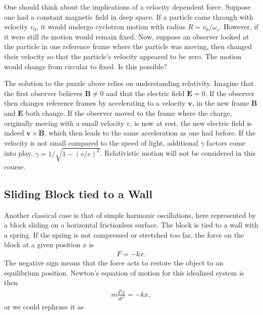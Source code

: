\documentclass[letterpaper,10pt,english]{sphinxmanual}
\begin{document}
One should think about the implications of a velocity dependent
force. Suppose one had a constant magnetic field in deep space. If a
particle came through with velocity \(v_0\), it would undergo cyclotron
motion with radius \(R=v_0/\omega_c\). However, if it were still its
motion would remain fixed. Now, suppose an observer looked at the
particle in one reference frame where the particle was moving, then
changed their velocity so that the particle’s velocity appeared to be
zero. The motion would change from circular to fixed. Is this
possible?

The solution to the puzzle above relies on understanding
relativity. Imagine that the first observer believes \(\boldsymbol{B}\ne 0\) and
that the electric field \(\boldsymbol{E}=0\). If the observer then changes
reference frames by accelerating to a velocity \(\boldsymbol{v}\), in the new
frame \(\boldsymbol{B}\) and \(\boldsymbol{E}\) both change. If the observer moved to the
frame where the charge, originally moving with a small velocity \(v\),
is now at rest, the new electric field is indeed \(\boldsymbol{v}\times\boldsymbol{B}\),
which then leads to the same acceleration as one had before. If the
velocity is not small compared to the speed of light, additional
\(\gamma\) factors come into play,
\(\gamma=1/\sqrt{1-(v/c)^2}\). Relativistic motion will not be
considered in this course.


\subsection{Sliding Block tied to a Wall}
\label{\detokenize{chapter2:sliding-block-tied-to-a-wall}}
Another classical case is that of simple harmonic oscillations, here represented by a block sliding on a horizontal frictionless surface. The block is tied to a wall with a spring. If the spring is not compressed or stretched too far, the force on the block at a given position \(x\) is
\begin{equation*}
\begin{split}
F=-kx.
\end{split}
\end{equation*}
The negative sign means that the force acts to restore the object to an equilibrium position. Newton’s equation of motion for this idealized system is then
\begin{equation*}
\begin{split}
m\frac{d^2x}{dt^2}=-kx,
\end{split}
\end{equation*}
or we could rephrase it as
\end{document}
